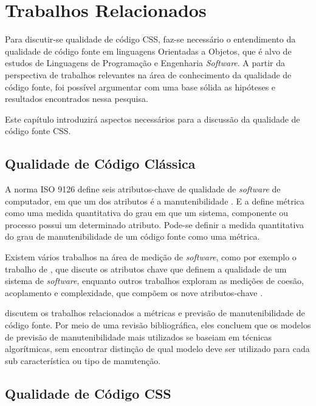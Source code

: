 %
%

\chapter{Trabalhos Relacionados}

Para discutir-se qualidade de código CSS, faz-se necessário o entendimento da qualidade de código fonte em linguagens Orientadas a Objetos, que é alvo de estudos de Linguagens de Programação e Engenharia \textit{Software}. 
A partir da perspectiva de trabalhos relevantes na área de conhecimento da qualidade de código fonte, foi possível argumentar com uma base sólida as hipóteses e resultados encontrados nessa pesquisa.

Este capítulo introduzirá aspectos necessários para a discussão da qualidade de código fonte CSS.

\section{Qualidade de Código Clássica}

A norma ISO 9126 define seis atributos-chave de qualidade de \textit{software} de computador, em que um dos atributos é a manutenibilidade \cite{Pressman:2010}. E a  define métrica como uma medida quantitativa do grau em que um sistema, componente ou processo possui um determinado atributo. Pode-se definir a medida quantitativa do grau de manutenibilidade de um código fonte como uma métrica.

Existem vários trabalhos na área de medição de \textit{software}, como por exemplo o trabalho de , que discute os atributos chave que definem a qualidade de um sistema de \textit{software}, enquanto outros trabalhos exploram as medições de coesão, acoplamento e complexidade, que compõem os nove atributos-chave \cite{McCabe:1989,Zuse:1991,Bieman1994,Dhama:1995,Zuse:1997} .

 discutem os trabalhos relacionados a métricas e previsão de manutenibilidade de código fonte. Por meio de uma revisão bibliográfica, eles concluem que os modelos de previsão de manutenibilidade mais utilizados se baseiam em técnicas algorítmicas, sem encontrar distinção de qual modelo deve ser utilizado para cada sub característica ou tipo de manutenção.

\section{Qualidade de Código CSS}

